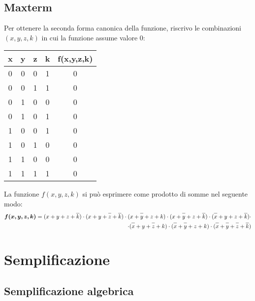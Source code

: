 \documentclass{article}
\newcommand*{\oline}[1]{\overline{#1\mathstrut}}
\begin{document}
\subsection*{Maxterm}
Per ottenere la seconda forma canonica della funzione, riscrivo le combinazioni $(x,y,z,k)$ in cui la funzione assume valore $0$:
\begin{center}
  \begin{tabular}{|c|c|c|c|c|}
    \hline
    \textbf{x} & \textbf{y} & \textbf{z} & \textbf{k} & \textbf{f(x,y,z,k)} \\
    \hline
      0 & 0 & 0 & 1 & 0 \\
    \hline
      0 & 0 & 1 & 1 & 0 \\
    \hline
      0 & 1 & 0 & 0 & 0 \\
    \hline
      0 & 1 & 0 & 1 & 0 \\
    \hline
      1 & 0 & 0 & 1 & 0 \\
    \hline
      1 & 0 & 1 & 0 & 0 \\
    \hline
      1 & 1 & 0 & 0 & 0 \\
    \hline
      1 & 1 & 1 & 1 & 0 \\
    \hline
  \end{tabular}
\end{center}
La funzione $f(x,y,z,k)$ si può esprimere come prodotto di somme nel seguente modo:
\begin{align*}
  \bm{f(x,y,z,k)} = (x+y+z+\oline{k}) \cdot (x+y+\oline{z}+\oline{k}) \cdot (x+\oline{y}+z+k) \cdot (x+\oline{y}+z+\oline{k}) \cdot (\oline{x}+y+z+\oline{k}) \cdot\\
  \cdot (\oline{x}+y+\oline{z}+k) \cdot (\oline{x}+\oline{y}+z+k) \cdot (\oline{x}+\oline{y}+\oline{z}+\oline{k})
\end{align*}

\section{Semplificazione}

\subsection*{Semplificazione algebrica}
\end{document}
